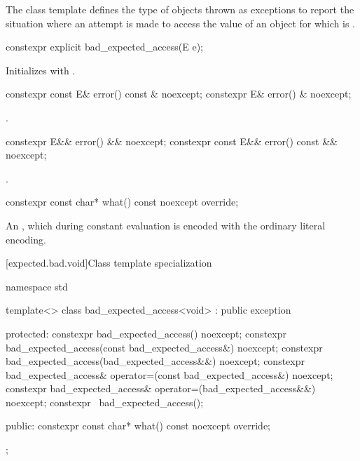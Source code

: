\pnum
The class template 
defines the type of objects thrown as exceptions to report the situation
where an attempt is made to access the value of an  object
for which  is .

%
\begin{itemdecl}
constexpr explicit bad_expected_access(E e);
\end{itemdecl}

\begin{itemdescr}
\pnum
\effects
Initializes  with .
\end{itemdescr}

%
\begin{itemdecl}
constexpr const E& error() const & noexcept;
constexpr E& error() & noexcept;
\end{itemdecl}

\begin{itemdescr}
\pnum
\returns
{}.
\end{itemdescr}

%
\begin{itemdecl}
constexpr E&& error() && noexcept;
constexpr const E&& error() const && noexcept;
\end{itemdecl}

\begin{itemdescr}
\pnum
\returns
{}.
\end{itemdescr}

%
\begin{itemdecl}
constexpr const char* what() const noexcept override;
\end{itemdecl}

\begin{itemdescr}
\pnum
\returns
An  \ntbs,
which during constant evaluation is encoded with
the ordinary literal encoding.
\end{itemdescr}

[expected.bad.void]{Class template specialization }

\begin{codeblock}
namespace std {
  template<>
  class bad_expected_access<void> : public exception {
  protected:
    constexpr bad_expected_access() noexcept;
    constexpr bad_expected_access(const bad_expected_access&) noexcept;
    constexpr bad_expected_access(bad_expected_access&&) noexcept;
    constexpr bad_expected_access& operator=(const bad_expected_access&) noexcept;
    constexpr bad_expected_access& operator=(bad_expected_access&&) noexcept;
    constexpr ~bad_expected_access();

  public:
    constexpr const char* what() const noexcept override;
  };
}
\end{codeblock}


